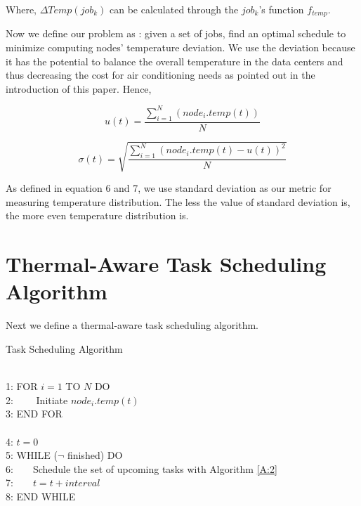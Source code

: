 Where, $\Delta Temp(job_k)$ can be calculated through the $job_k$'s function $f_{temp}$.

Now we define our problem as :
given a set of jobs, find an optimal schedule to minimize computing nodes' temperature deviation. We use the deviation because it has the potential to balance the overall temperature in the data centers and thus decreasing the cost for air conditioning needs as pointed out in the introduction of this paper. Hence, 
%


\begin{equation}
u(t)=\frac{\sum_{i=1}^{N} (node_i.temp(t))}{N}
\end{equation}

\begin{equation}
\sigma (t)=\sqrt{\frac{\sum_{i=1}^{N}(node_i.temp(t)-u(t))^2}{N}}
\end{equation}

As defined in equation 6 and 7, we use standard deviation as our metric for measuring temperature distribution. The less the value of standard deviation is, the more even temperature distribution is.

\section{Thermal-Aware Task Scheduling Algorithm}\label{S:algorithm}

Next we define a thermal-aware task scheduling algorithm.

\newcommand{\BH}{\mbox{~~~~}}
\newcommand{\SH}{\mbox{~~}}

\begin{algorithm}
\caption{Task Scheduling Algorithm}
\label{A:1}
~\\
1:  FOR $i =1$  TO  $N$ DO\\
2:  \BH Initiate $node_i.temp(t)$ \\
3:  END FOR\\
\\ 
4:       $t=0$\\
5:       WHILE ($\lnot$ finished) DO\\
6:\BH     Schedule the set of upcoming tasks with Algorithm \ref{A:2}\\
7:\BH     $t=t+interval$\\
8:		 END WHILE\\
\end{algorithm}

